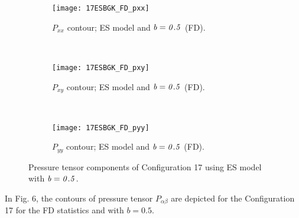 \documentclass{rsproca}%
\begin{document}
\begin{figure}
        \centering
        \begin{subfigure}[b]{0.32\textwidth}
                \centering
                \texttt{[image: 17ESBGK\_FD\_pxx]}
                \caption{$P_{xx}$ contour; ES model and $\it{b=0.5}$ (FD).}
                \label{fig:17ESBGK_FD_pxx}
        \end{subfigure}%
        ~ %
        \begin{subfigure}[b]{0.32\textwidth}
                \centering
                \texttt{[image: 17ESBGK\_FD\_pxy]}
                \caption{$P_{xy}$ contour; ES model and $\it{b=0.5}$ (FD).}
                \label{fig:17ESBGK_FD_pxy}
        \end{subfigure}
        ~ %
        \begin{subfigure}[b]{0.32\textwidth}
                \centering
                \texttt{[image: 17ESBGK\_FD\_pyy]}
                \caption{$P_{yy}$ contour; ES model and $\it{b=0.5}$ (FD).}
                \label{fig:17ESBGK_FD_pyy}
        \end{subfigure}
        \caption{Pressure tensor components of Configuration 17 using ES model with $\it{b=0.5}$.}\label{fig:conf5_pTensor_FD}
\end{figure}
In Fig. 6, the contours of pressure tensor $P_{\alpha \beta}$ are depicted for the Configuration 17 for the FD statistics and with $b=0.5$.
\end{document}

